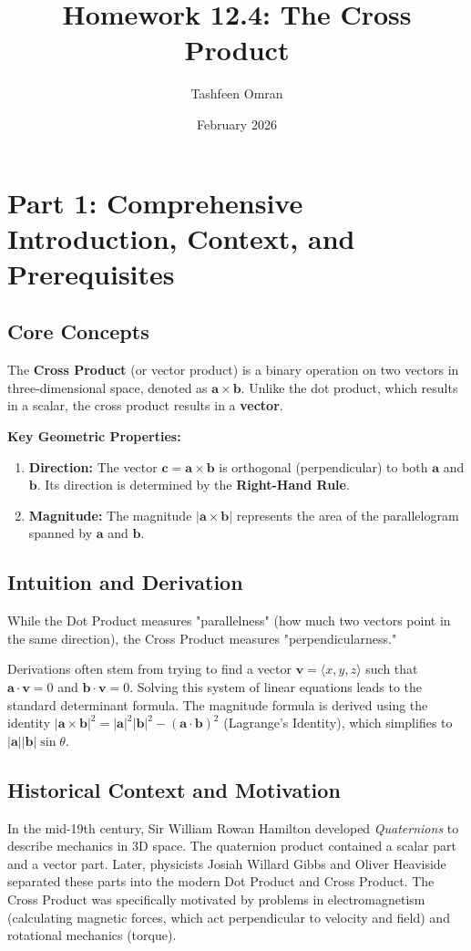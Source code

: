 \documentclass[11pt]{article}
\title{\textbf{Homework 12.4: The Cross Product}}
\author{Tashfeen Omran}
\date{February 2026}
\renewcommand{\vec}[1]{\mathbf{#1}}
\begin{document}
\maketitle

\tableofcontents
\newpage

\section{Part 1: Comprehensive Introduction, Context, and Prerequisites}

\subsection{Core Concepts}
The \textbf{Cross Product} (or vector product) is a binary operation on two vectors in three-dimensional space, denoted as $\vec{a} \times \vec{b}$. Unlike the dot product, which results in a scalar, the cross product results in a \textbf{vector}.

\textbf{Key Geometric Properties:}
\begin{enumerate}
    \item \textbf{Direction:} The vector $\vec{c} = \vec{a} \times \vec{b}$ is orthogonal (perpendicular) to both $\vec{a}$ and $\vec{b}$. Its direction is determined by the \textbf{Right-Hand Rule}.
    \item \textbf{Magnitude:} The magnitude $|\vec{a} \times \vec{b}|$ represents the area of the parallelogram spanned by $\vec{a}$ and $\vec{b}$.
\end{enumerate}

\subsection{Intuition and Derivation}
While the Dot Product measures "parallelness" (how much two vectors point in the same direction), the Cross Product measures "perpendicularness." 

Derivations often stem from trying to find a vector $\vec{v} = \langle x, y, z \rangle$ such that $\vec{a} \cdot \vec{v} = 0$ and $\vec{b} \cdot \vec{v} = 0$. Solving this system of linear equations leads to the standard determinant formula. The magnitude formula is derived using the identity $|\vec{a} \times \vec{b}|^2 = |\vec{a}|^2|\vec{b}|^2 - (\vec{a} \cdot \vec{b})^2$ (Lagrange's Identity), which simplifies to $|\vec{a}||\vec{b}|\sin \theta$.

\subsection{Historical Context and Motivation}
In the mid-19th century, Sir William Rowan Hamilton developed \textit{Quaternions} to describe mechanics in 3D space. The quaternion product contained a scalar part and a vector part. Later, physicists Josiah Willard Gibbs and Oliver Heaviside separated these parts into the modern Dot Product and Cross Product. The Cross Product was specifically motivated by problems in electromagnetism (calculating magnetic forces, which act perpendicular to velocity and field) and rotational mechanics (torque).
\end{document}
